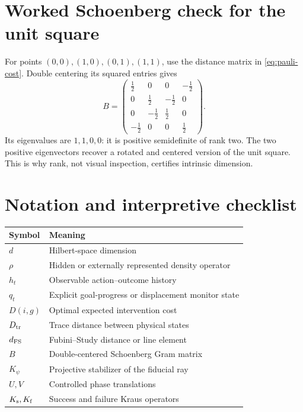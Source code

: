\documentclass[11pt]{article}
\theoremstyle{definition}
\theoremstyle{remark}
\begin{document}
\section{Worked Schoenberg check for the unit square}
\label{app:square}

For points $(0,0),(1,0),(0,1),(1,1)$, use the distance matrix in
\cref{eq:pauli-cost}. Double centering its squared entries gives
\begin{equation}
B=
\begin{pmatrix}
\frac12&0&0&-\frac12\\
0&\frac12&-\frac12&0\\
0&-\frac12&\frac12&0\\
-\frac12&0&0&\frac12
\end{pmatrix}.
\label{eq:square-gram}
\end{equation}
Its eigenvalues are $1,1,0,0$: it is positive semidefinite of rank two.
The two positive eigenvectors recover a rotated and centered version of the
unit square. This is why rank, not visual inspection, certifies intrinsic
dimension.

\section{Notation and interpretive checklist}

\begin{tabularx}{\textwidth}{lX}
\toprule
Symbol & Meaning\\
\midrule
$d$ & Hilbert-space dimension\\
$\rho$ & Hidden or externally represented density operator\\
$h_t$ & Observable action--outcome history\\
$q_t$ & Explicit goal-progress or displacement monitor state\\
$D(i,g)$ & Optimal expected intervention cost\\
$D_{\rm tr}$ & Trace distance between physical states\\
$d_{\rm FS}$ & Fubini--Study distance or line element\\
$B$ & Double-centered Schoenberg Gram matrix\\
$K_\psi$ & Projective stabilizer of the fiducial ray\\
$U,V$ & Controlled phase translations\\
$K_{\rm s},K_{\rm f}$ & Success and failure Kraus operators\\
\bottomrule
\end{tabularx}
\end{document}
